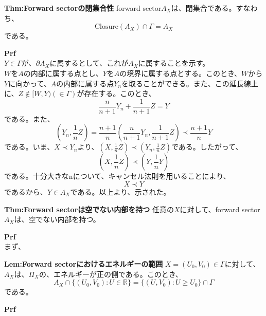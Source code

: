 \documentclass[a4paper,11pt]{jsarticle}
\begin{document}
\begin{itembox}[l]{\textbf{Thm:Forward sectorの閉集合性}}
forward sector$A_X$は、閉集合である。すなわち、
\begin{equation}
   \mathrm{Closure}(A_X) \cap \Gamma = A_X
\end{equation}
である。
\end{itembox}
\textbf{Prf}\\
$Y \in \Gamma$が、$\partial A_X$に属するとして、これが$A_X$に属することを示す。\\
$W$を$A$の内部に属する点とし、$Y$を$A$の境界に属する点とする。このとき、$W$から$Y$に向かって、$A$の内部に属する点$Y_n$を取ることができる。また、この延長線上に、$Z \notin [W,Y)(\in \Gamma)$が存在する。このとき、
\begin{equation}
    \frac{n}{n+1}Y_n + \frac{1}{n+1}Z=Y 
\end{equation}
である。また、
\begin{equation}
    (Y_n,\frac{1}{n}Z) =\frac{n+1}{n}(\frac{n}{n+1}Y_n,\frac{1}{n+1}Z) \prec \frac{n+1}{n}Y
\end{equation}
である。いま、$X\prec Y_n$より、$(X,\frac{1}{n}Z) \prec (Y_n,\frac{1}{n}Z)$である。したがって、
\begin{equation}
    (X,\frac{1}{n}Z) \prec (Y,\frac{1}{n}Y)
\end{equation}
である。十分大きなnについて、キャンセル法則を用いることにより、
\begin{equation}
    X \prec Y
\end{equation}
であるから、$Y \in A_X$である。以上より、示された。\hfill\qedsymbol\\

\begin{itembox}[l]{\textbf{Thm:Forward sectorは空でない内部を持つ}}
任意の$X$に対して、forward sector$A_X$は、空でない内部を持つ。
\end{itembox}
\textbf{Prf}\\
まず、

\begin{itembox}[l]{\textbf{Lem:Forward sectorにおけるエネルギーの範囲}}
    $X=(U_0,V_0) \in \Gamma$に対して、$A_X$は、$\Pi_X$の、エネルギーが正の側である。このとき、
    \begin{equation}
        A_X \cap \{(U_0,V_0):U \in \mathbb{R}\}=\{(U,V_0):U \geq U_0\}\cap \Gamma
    \end{equation}
    である。
\end{itembox}
\textbf{Prf}\\
\end{document}
